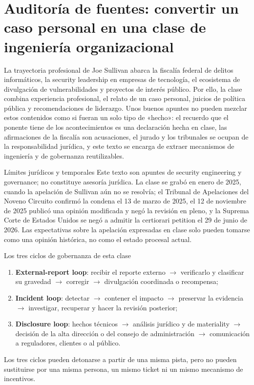 \section{Auditoría de fuentes: convertir un caso personal en una clase de ingeniería organizacional}

La trayectoria profesional de Joe Sullivan abarca la fiscalía federal de delitos informáticos, la security leadership en empresas de tecnología, el ecosistema de divulgación de vulnerabilidades y proyectos de interés público. Por ello, la clase combina experiencia profesional, el relato de un caso personal, juicios de política pública y recomendaciones de liderazgo. Unos buenos apuntes no pueden mezclar estos contenidos como si fueran un solo tipo de «hecho»: el recuerdo que el ponente tiene de los acontecimientos es una declaración hecha en clase, las afirmaciones de la fiscalía son acusaciones, el jurado y los tribunales se ocupan de la responsabilidad jurídica, y este texto se encarga de extraer mecanismos de ingeniería y de gobernanza reutilizables.

\begin{warningbox}{Límites jurídicos y temporales}
Este texto son apuntes de security engineering y governance; no constituye asesoría jurídica. La clase se grabó en enero de 2025, cuando la apelación de Sullivan aún no se resolvía; el Tribunal de Apelaciones del Noveno Circuito confirmó la condena el 13 de marzo de 2025, el 12 de noviembre de 2025 publicó una opinión modificada y negó la revisión en pleno, y la Suprema Corte de Estados Unidos se negó a admitir la certiorari petition el 29 de junio de 2026. Las expectativas sobre la apelación expresadas en clase solo pueden tomarse como una opinión histórica, no como el estado procesal actual.
\end{warningbox}

\begin{importantbox}{Los tres ciclos de gobernanza de esta clase}
\begin{enumerate}
  \item \textbf{External-report loop}: recibir el reporte externo $\rightarrow$ verificarlo y clasificar su gravedad $\rightarrow$ corregir $\rightarrow$ divulgación coordinada o recompensa;
  \item \textbf{Incident loop}: detectar $\rightarrow$ contener el impacto $\rightarrow$ preservar la evidencia $\rightarrow$ investigar, recuperar y hacer la revisión posterior;
  \item \textbf{Disclosure loop}: hechos técnicos $\rightarrow$ análisis jurídico y de materiality $\rightarrow$ decisión de la alta dirección o del consejo de administración $\rightarrow$ comunicación a reguladores, clientes o al público.
\end{enumerate}
Los tres ciclos pueden detonarse a partir de una misma pista, pero no pueden sustituirse por una misma persona, un mismo ticket ni un mismo mecanismo de incentivos.
\end{importantbox}

